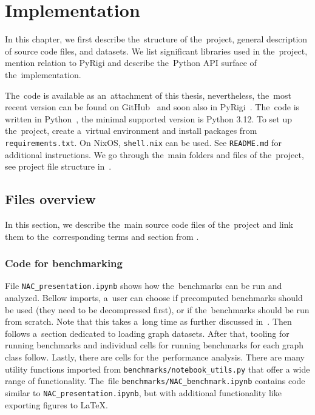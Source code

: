 
\chapter{Implementation}%
\label{chapter:impl}

\begin{chapterabstract}

	In this chapter,
	we first describe the~structure of the~project,
	general description of source code files, and datasets.
	We list significant libraries used in the~project,
	mention relation to PyRigi and
	describe the~Python API surface of the~implementation.

\end{chapterabstract}

The~code is available as an~attachment of this thesis,
 nevertheless, the~most recent version can be found on GitHub~\cite{my_code}
and soon also in PyRigi~\cite{pyrigi}.
%
The~code is written in Python~\cite{python}, the minimal supported version is Python 3.12.
To set up the~project, create a~virtual environment and install packages
from \texttt{requirements.txt}. On NixOS, \texttt{shell.nix} can be used.
See \texttt{README.md} for additional instructions.
We go through the~main folders and files of the~project,
see project file structure in~.


\section{Files overview}

In this section, we describe the~main source code files of the~project
and link them to the~corresponding terms and section
from .

\subsection{Code for benchmarking}

File \texttt{NAC\_presentation.ipynb} shows how the~benchmarks
can be run and analyzed.
Bellow imports, a~user can choose if precomputed benchmarks should be used
(they need to be decompressed first),
or if the~benchmarks should be run from scratch.
Note that this takes a~long time
as further discussed in~.
Then follows a~section dedicated to loading graph datasets.
After that, tooling for running benchmarks and individual cells
for running benchmarks for each graph class follow.
Lastly, there are cells for the~performance analysis.
%
There are many utility functions
imported from \texttt{benchmarks/notebook\_utils.py}
that offer a wide range of functionality.
The~file \texttt{benchmarks/NAC\_benchmark.ipynb}
contains code similar to \texttt{NAC\_presentation.ipynb},
but with additional functionality like exporting figures to \LaTeX{}.

